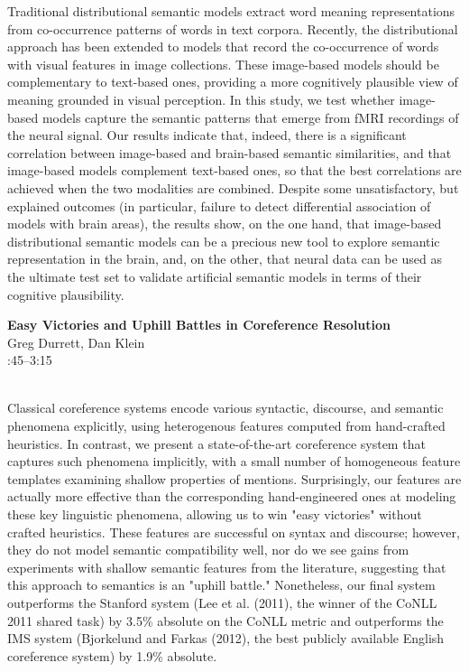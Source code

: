 \documentclass[twoside,makeidx]{book}
\renewcommand{\normalsize}{\fontsize{8}{9}\selectfont}
\renewcommand{\small}{\fontsize{7}{8}\selectfont}
\begin{document}
\nopagebreak%
\noindent%
{\small Traditional distributional semantic models extract word meaning   representations from co-occurrence patterns of words in text   corpora. Recently, the distributional approach has been extended to   models that record the co-occurrence of words with visual features   in image collections. These image-based models should be   complementary to text-based ones, providing a more cognitively   plausible view of meaning grounded in visual perception. In this   study, we test whether image-based models capture the semantic   patterns that emerge from fMRI recordings of the neural signal. Our   results indicate that, indeed, there is a significant correlation   between image-based and brain-based semantic similarities, and that   image-based models complement text-based ones, so that the best   correlations are achieved when the two modalities are   combined. Despite some unsatisfactory, but explained outcomes (in particular,   failure to detect differential association of models with brain   areas), the results show, on the one hand, that image-based   distributional semantic models can be a precious new tool to explore   semantic representation in the brain, and, on the other, that neural   data can be used as the ultimate test set to validate artificial   semantic models in terms of their cognitive plausibility.}
\par\vspace{2em}\noindent%
\begin{minipage}{\linewidth}%
\begin{center}
\textbf{\normalsize Easy Victories and Uphill Battles in Coreference Resolution}\\
\normalsize  Greg Durrett,  Dan Klein\\
{\small 2:45--3:15}\\
\end{center}
\end{minipage}\\[0.5em]
\nopagebreak%
\noindent%
{\small Classical coreference systems encode various syntactic, discourse, and semantic phenomena explicitly, using heterogenous features computed from hand-crafted heuristics.  In contrast, we present a state-of-the-art coreference system that captures such phenomena implicitly, with a small number of homogeneous feature templates examining shallow properties of mentions.  Surprisingly, our features are actually more effective than the corresponding hand-engineered ones at modeling these key linguistic phenomena, allowing us to win "easy victories" without crafted heuristics. These features are successful on syntax and discourse; however, they do not model semantic compatibility well, nor do we see gains from experiments with shallow semantic features from the literature, suggesting that this approach to semantics is an "uphill battle." Nonetheless, our final system outperforms the Stanford system (Lee et al. (2011), the winner of the CoNLL 2011 shared task) by 3.5\% absolute on the CoNLL metric and outperforms the IMS system (Bjorkelund and Farkas (2012), the best publicly available English coreference system) by 1.9\% absolute.}
\clearpage
\end{document}

